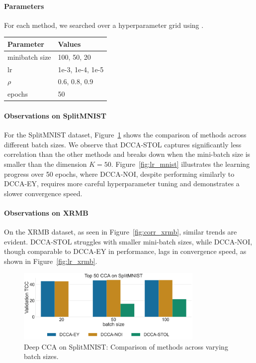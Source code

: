 \paragraph{Parameters} For each method, we searched over a hyperparameter grid using \citet{wandb}.

\begin{table}[h!]
    \centering
    \begin{tabular}{|l|l|}
        \hline Parameter           & Values           \\
        \hline minibatch size      & 100, 50, 20      \\
        \hline lr                  & 1e-3, 1e-4, 1e-5 \\
        \hline $\rho$\footnotemark & 0.6, 0.8, 0.9    \\
        \hline epochs              & 50               \\
        \hline
    \end{tabular}
    \label{tab:hyperparams}
\end{table}

\paragraph{Observations on SplitMNIST}
For the SplitMNIST dataset, Figure~\ref{fig:corr_mnist} shows the comparison of methods across different batch sizes.
We observe that DCCA-STOL captures significantly less correlation than the other methods and breaks down when the mini-batch size is smaller than the dimension $K=50$.
Figure~\ref{fig:lr_mnist} illustrates the learning progress over 50 epochs, where DCCA-NOI, despite performing similarly to DCCA-EY, requires more careful hyperparameter tuning and demonstrates a slower convergence speed.

\paragraph{Observations on XRMB}
On the XRMB dataset, as seen in Figure~\ref{fig:corr_xrmb}, similar trends are evident.
DCCA-STOL struggles with smaller mini-batch sizes, while DCCA-NOI, though comparable to DCCA-EY in performance, lags in convergence speed, as shown in Figure~\ref{fig:lr_xrmb}.

\begin{figure}
    \centering
    \includegraphics[width=0.8\textwidth]{figures/DCCA/SplitMNIST_models_different_batch_sizes}
    \caption{Deep CCA on SplitMNIST: Comparison of methods across varying batch sizes.}
    \label{fig:corr_mnist}
\end{figure}

